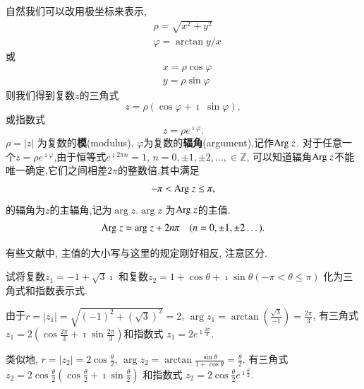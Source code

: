 自然我们可以改用极坐标来表示,
\begin{align}
    & \rho = \sqrt{x^2 + y^2}\\
    & \varphi = \arctan y/x
\end{align}
或
\begin{align}
    & x = \rho \cos\varphi \\
    & y = \rho \sin\varphi 
\end{align}
则我们得到复数$z$的三角式
\begin{equation}
    z = \rho (\cos\varphi +  \imath\; \sin\varphi) ,
\end{equation}
或指数式
\begin{equation}
    z = \rho e^{\imath \varphi} .
\end{equation}
$\rho = |z|$ 为复数的{\bf 模}(modulus), $\varphi$为复数的{\bf 辐角}(argument),记作${\mathrm{Arg}\;} z$.
对于任意一个$z=\rho e^{\imath \varphi}$,由于恒等式$e^{\imath 2\pi n} = 1$, $n = 0, \pm 1, \pm 2, \dots, \in \mathbb{Z}$,
可以知道辐角${\mathrm{Arg}\;} z$不能唯一确定,它们之间相差$2\pi$的整数倍,其中满足
\begin{align}
    -\pi < {\mathrm{Arg}\;} z \leq \pi ,
\end{align}
的辐角为$z$的主辐角,记为$\arg z$.$\arg z$ 为${\mathrm{Arg}\;} z$的主值.
\begin{align}
    {\mathrm{Arg}\;} z = {\mathrm{arg}\;} z + 2 n \pi \quad (n = 0, \pm 1, \pm 2\dots).
\end{align}
\begin{note}
有些文献中, 主值的大小写与这里的规定刚好相反, 注意区分.
\end{note}

\begin{example}
试将复数$z_1 = -1 + \sqrt{3} \imath$ 和复数$z_2 = 1 + \cos \theta + \imath \sin\theta 
(-\pi < \theta \leq \pi)$ 化为三角式和指数表示式.
\end{example}
\begin{solution}
    由于$r = |z_1| = \sqrt{(-1)^2 + (\sqrt{3})^2} = 2$, 
    $\arg z_1 = \arctan (\frac{\sqrt{3}}{-1}) = \frac{2\pi}{3}$,
    有三角式$z_1  = 2(\cos \frac{2\pi}{3} + \imath \sin \frac{2\pi}{3})$和指数式
    $z_1 = 2 e^{\imath \frac{2\pi }{3}}$.
    
    类似地, $r = |z_2| = 2 \cos \frac{\theta}{2}$, $\arg z_2 = \arctan \frac{\sin \theta}{1 + \cos \theta}
    = \frac{\theta}{2}$. 
    有三角式$z_2 = 2 \cos\frac{\theta}{2} ( \cos\frac{\theta}{2} + \imath \sin \frac{\theta}{2})$
和指数式 $z_2 = 2\cos\frac{\theta}{2} e^{\imath \frac{\theta}{2}}$.
\end{solution}


